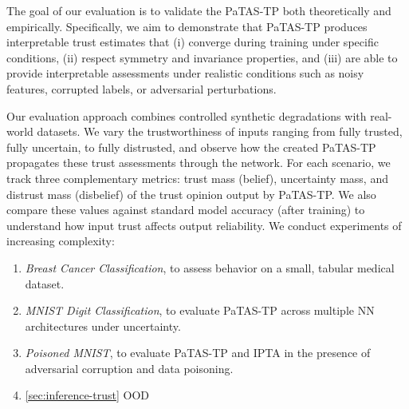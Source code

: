 The goal of our evaluation is to validate the \ac{PaTAS-TP} both theoretically and empirically. Specifically, we aim to demonstrate that \ac{PaTAS-TP} produces interpretable trust estimates that (i) converge during training under specific conditions, (ii) respect symmetry and invariance properties, and (iii) are able to provide interpretable assessments under realistic conditions such as noisy features, corrupted labels, or adversarial perturbations\DIFaddbegin {}\DIFaddend .  

Our evaluation approach combines controlled synthetic degradations with real-world datasets. We vary the trustworthiness of inputs ranging from fully trusted, fully uncertain, to fully distrusted, and observe how the created \ac{PaTAS-TP} propagates these trust assessments through the network. For each scenario, we track three complementary metrics: trust mass (belief), uncertainty mass, and distrust mass (disbelief) of the trust opinion output by \ac{PaTAS-TP}. We also compare these values against standard model accuracy (after training) to understand how input trust affects output reliability. We conduct \DIFdelbegin {}\DIFdelend \DIFaddbegin {}\DIFaddend experiments of increasing complexity\DIFdelbegin {}\DIFdelend :  
\begin{enumerate}
  \item \emph{Breast Cancer Classification}, to assess behavior on a small, tabular medical dataset.  
  \item \emph{MNIST Digit Classification}, to evaluate \ac{PaTAS-TP} across multiple \ac{NN} architectures under uncertainty.
  \item \emph{Poisoned MNIST}, to evaluate \ac{PaTAS-TP} and \ac{IPTA} in the presence of adversarial corruption and data poisoning.  
  \DIFaddbegin \item \emph{}\cref{sec:inference-trust} \ac{OOD} \DIFaddend \end{enumerate}


